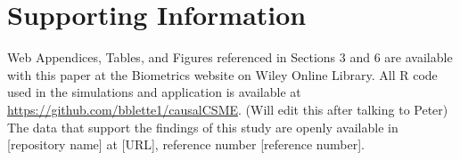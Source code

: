 \documentclass[useAMS,usenatbib,referee]{biom}
\begin{document}








\section*{Supporting Information}

Web Appendices, Tables, and Figures referenced in Sections 3 and 6 are available with this paper at the Biometrics website on Wiley Online Library. All R code used in the simulations and application is available at \href{https://github.com/bblette1/causalCSME}{https://github.com/bblette1/causalCSME}. (Will edit this after talking to Peter) The data that support the findings of this study are openly available in [repository name] at [URL], reference number [reference number].\vspace*{-8pt}

\label{lastpage}
\end{document}
